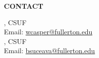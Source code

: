 \documentclass[a4paper]{article}
\begin{document}
\begin{minipage}{0.95\textwidth}
\begin{minipage}[b]{0.47\textwidth}
\bigskip
\textbf{\color{csecondary}\large CONTACT }\par

, CSUF\\
Email: \href{mailto:wcasper@fullerton.edu}{wcasper@fullerton.edu}\\
, CSUF\\
Email: \href{mailto:bsuceava@fullerton.edu}{bsuceava@fullerton.edu}\\
\bigskip
\bigskip
\rule{0pt}{78pt}
\end{minipage}
\vspace*{-70pt}

\end{minipage}
\end{document}

